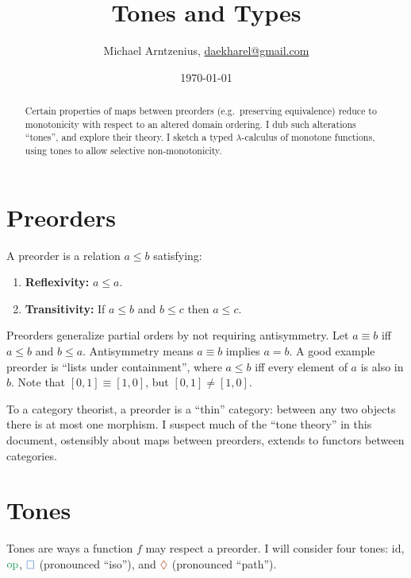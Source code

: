 \documentclass{rntz}
\title{Tones and Types}
\author{Michael Arntzenius, %
  \href{mailto:daekharel@gmail.com}{daekharel@gmail.com}}
\date{\today}
\newcommand\opcolor{\color{ForestGreen}}
\newcommand\isocolor{\color{NavyBlue}}
\newcommand\pathcolor{\color{Bittersweet}}
\newcommand\id{\ensuremath{\mathrm{id}}}
\newcommand\op{\ensuremath{\mathrm{\opcolor op}}}
\newcommand\iso{\texorpdfstring{\ensuremath{{\isocolor\Box}}}{iso}}
\renewcommand\path{\texorpdfstring{\ensuremath{{\pathcolor\lozenge}}}{path}}
\begin{document}
\maketitle

\begin{abstract}
 Certain properties of maps between preorders (e.g.\ preserving equivalence)
 reduce to monotonicity with respect to an altered domain ordering. I dub such
 alterations ``tones'', and explore their theory. I sketch a typed
 $\lambda$-calculus of monotone functions, using tones to allow selective
 non-mono\-tonicity.
\end{abstract}

\section{Preorders}

A preorder is a relation $a \le b$ satisfying:
\begin{enumerate}
\item \textbf{Reflexivity:} $a \le a$.
\item \textbf{Transitivity:} If $a \le b$ and $b \le c$ then $a \le c$.
\end{enumerate}

Preorders generalize partial orders by not requiring antisymmetry. Let
$a \equiv b$ iff $a \le b$ and $b \le a$. Antisymmetry means $a \equiv b$
implies $a = b$.
%
A good example preorder is ``lists under containment'', where $a \le b$ iff
every element of $a$ is also in $b$. Note that $[0,1] \equiv [1,0]$, but $[0,1]
\ne [1,0]$.

To a category theorist, a preorder is a ``thin'' category: between any two
objects there is at most one morphism. I suspect much of the ``tone theory'' in
this document, ostensibly about maps between preorders, extends to functors
between categories.


\section{Tones}\label{sec:tones}

Tones are ways a function $f$ may respect a preorder. I will consider four
tones: \id, \op, \iso{} (pronounced ``iso''), and \path{} (pronounced ``path'').
\end{document}
